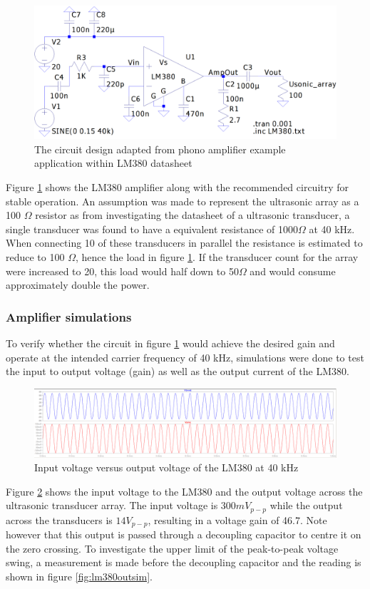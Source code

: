 \begin{figure}[ht!]
    \centering
    \includegraphics[width=\textwidth]{Figures/Design/amplifier/lm380circwhitestable.png}
    \caption{The circuit design adapted from phono amplifier example application within LM380 datasheet}
    \label{fig:lm380circ}
\end{figure}

Figure \ref{fig:lm380circ} shows the LM380 amplifier along with the recommended circuitry for stable operation. An assumption was made to represent the ultrasonic array as a 100 $\Omega$ resistor as from investigating the datasheet of a ultrasonic transducer, a single transducer was found to have a equivalent resistance of 1000$\Omega$ at 40 kHz. When connecting 10 of these transducers in parallel the resistance is estimated to reduce to 100 $\Omega$, hence the load in figure \ref{fig:lm380circ}. If the transducer count for the array were increased to 20, this load would half down to 50$\Omega$ and would consume approximately double the power.

\subsubsection{Amplifier simulations}
To verify whether the circuit in figure \ref{fig:lm380circ} would achieve the desired gain and operate at the intended carrier frequency of 40 kHz, simulations were done to test the input to output voltage (gain) as well as the output current of the LM380.

\begin{figure}[ht!]
    \centering
    \includegraphics[width=\textwidth]{Figures/Design/amplifier/vinvout.png}
    \caption{Input voltage versus output voltage of the LM380 at 40 kHz}
    \label{fig:lm380inoutsim}
\end{figure}
Figure \ref{fig:lm380inoutsim} shows the input voltage to the LM380 and the output voltage across the ultrasonic transducer array. The input voltage is $300mV_{p-p}$ while the output across the transducers is $14V_{p-p}$, resulting in a voltage gain of 46.7. Note however that this output is passed through a decoupling capacitor to centre it on the zero crossing. To investigate the upper limit of the peak-to-peak voltage swing, a measurement is made before the decoupling capacitor and the reading is shown in figure \ref{fig:lm380outsim}.

